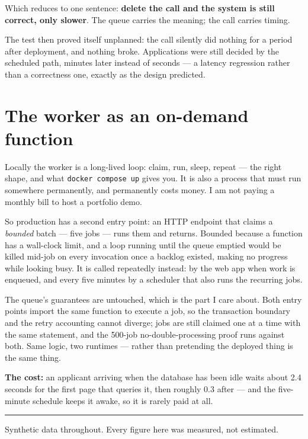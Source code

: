 \documentclass[11pt,a4paper]{article}
\begin{document}
Which reduces to one sentence: \textbf{delete the call and the system is still
correct, only slower}. The queue carries the meaning; the call carries timing.

The test then proved itself unplanned: the call silently did nothing for a period
after deployment, and nothing broke. Applications were still decided by the
scheduled path, minutes later instead of seconds --- a latency regression rather
than a correctness one, exactly as the design predicted.

\section{The worker as an on-demand function}

Locally the worker is a long-lived loop: claim, run, sleep, repeat --- the right
shape, and what \texttt{docker compose up} gives you. It is also a process that
must run somewhere permanently, and permanently costs money. I am not paying a
monthly bill to host a portfolio demo.

So production has a second entry point: an HTTP endpoint that claims a
\emph{bounded} batch --- five jobs --- runs them and returns. Bounded because a
function has a wall-clock limit, and a loop running until the queue emptied would
be killed mid-job on every invocation once a backlog existed, making no progress
while looking busy. It is called repeatedly instead: by the web app when work is
enqueued, and every five minutes by a scheduler that also runs the recurring
jobs.

The queue's guarantees are untouched, which is the part I care about. Both entry
points import the same function to execute a job, so the transaction boundary and
the retry accounting cannot diverge; jobs are still claimed one at a time with
the same statement, and the 500-job no-double-processing proof runs against both.
Same logic, two runtimes --- rather than pretending the deployed thing is the
same thing.

\textbf{The cost:} an applicant arriving when the database has been idle waits
about 2.4 seconds for the first page that queries it, then roughly 0.3 after ---
and the five-minute schedule keeps it awake, so it is rarely paid at all.

\par\vspace{0.4em}\hrule\vspace{0.35em}\noindent
{\footnotesize Synthetic data throughout. Every figure here was measured, not estimated.}
\end{document}
